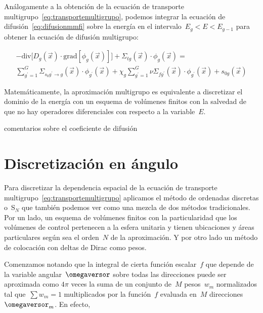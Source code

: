 Análogamente a la obtención de la ecuación de transporte multigrupo~\eqref{eq:transportemultigrupo}, podemos integrar la ecuación de difusión~\eqref{eq:difusionmmfi} sobre la energía en el intervalo~$E_g < E < E_{g-1}$ para obtener la ecuación de difusión multigrupo:

\begin{multline}\label{eq:difusionmultigrupo}
 - \text{div} \Big[ D_g(\vec{x}) \cdot \text{grad} \left[ \phi_g(\vec{x}) \right] \Big]
 + \Sigma_{t g}(\vec{x}) \cdot \phi_g(\vec{x})
 = \\
\sum_{g^\prime = 1}^G \Sigma_{s_0 g^\prime \rightarrow g}(\vec{x})  \cdot \phi_{g^\prime}(\vec{x}) +
\chi_g \sum_{g^\prime = 1}^G \nu\Sigma_{fg^\prime}(\vec{x}) \cdot \phi_{g^\prime}(\vec{x})+ s_{0g}(\vec{x})
\end{multline}

Matemáticamente, la aproximación multigrupo es equivalente a discretizar el dominio de la energía con un esquema de volúmenes finitos con la salvedad de que no hay operadores diferenciales con respecto a la variable~$E$.

{\color{red}comentarios sobre el coeficiente de difusión}

\section{Discretización en ángulo} %

Para discretizar la dependencia espacial de la ecuación de transporte multigrupo~\eqref{eq:transportemultigrupo} aplicamos el método de ordenadas discretas o~S$_N$
que también podemos ver como una mezcla de dos métodos tradicionales. Por un lado, un esquema de volúmenes finitos con la particularidad que los volúmenes de control pertenecen a la esfera unitaria y tienen ubicaciones y áreas particulares según sea el orden~$N$ de la aproximación. Y por otro lado un método de colocación con deltas de Dirac como pesos.

Comenzamos notando que la integral de cierta función escalar~$f$ que depende de la variable angular~$\omegaversor$ sobre todas las direcciones puede ser aproximada como $4\pi$ veces la suma de un conjunto de~$M$ pesos~$w_m$ normalizados tal que~$\sum w_m=1$ multiplicados por la función~$f$ evaluada en~$M$ direcciones~$\omegaversor_m$. En efecto,

